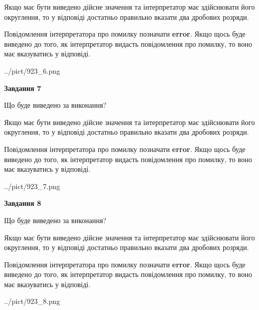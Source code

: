 \documentclass[12pt, ukrainian]{article}
\begin{document}
{\begin {Large}
Якщо має бути виведено дійсне значення та інтерпретатор має здійснювати його округлення, 
то у відповіді достатньо правильно вказати два дробових розряди.

Повідомлення інтерпретатора про помилку позначати \textbf{error}.
Якщо щось буде виведено до того, як інтерпретатор видасть повідомлення про помилку, 
то воно має вказуватись у відповіді. \par

\begin{center}
	{../pict/923_6.png}
\end{center}
\newpage

{\begin {center}\textbf{Завдання 7}\end {center}}\par
Що буде виведено за виконання? \par

Якщо має бути виведено дійсне значення та інтерпретатор має здійснювати його округлення, 
то у відповіді достатньо правильно вказати два дробових розряди.

Повідомлення інтерпретатора про помилку позначати \textbf{error}.
Якщо щось буде виведено до того, як інтерпретатор видасть повідомлення про помилку, 
то воно має вказуватись у відповіді. \par

\begin{center}
	{../pict/923_7.png}
\end{center}
\newpage

{\begin {center}\textbf{Завдання 8}\end {center}}\par
Що буде виведено за виконання? \par

Якщо має бути виведено дійсне значення та інтерпретатор має здійснювати його округлення, 
то у відповіді достатньо правильно вказати два дробових розряди.

Повідомлення інтерпретатора про помилку позначати \textbf{error}.
Якщо щось буде виведено до того, як інтерпретатор видасть повідомлення про помилку, 
то воно має вказуватись у відповіді. \par

\begin{center}
	{../pict/923_8.png}
\end{center}
\newpage


\end{Large}}
\end{document}

